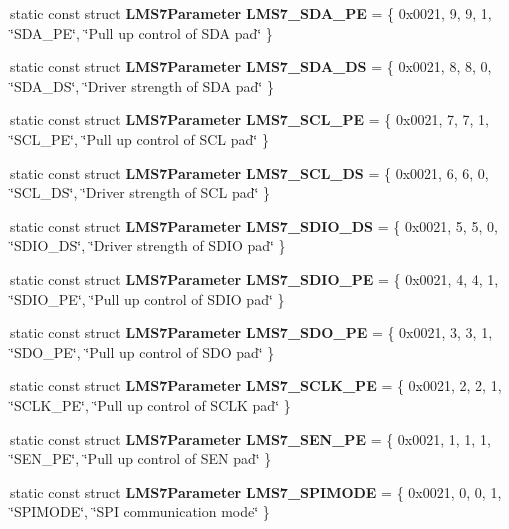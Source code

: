 \begin{DoxyCompactItemize}
\item 
static const struct {\bf L\+M\+S7\+Parameter} {\bf L\+M\+S7\+\_\+\+S\+D\+A\+\_\+\+PE} = \{ 0x0021, 9, 9, 1, \char`\"{}\+S\+D\+A\+\_\+\+P\+E\char`\"{}, \char`\"{}\+Pull up control of S\+D\+A pad\char`\"{} \}
\item 
static const struct {\bf L\+M\+S7\+Parameter} {\bf L\+M\+S7\+\_\+\+S\+D\+A\+\_\+\+DS} = \{ 0x0021, 8, 8, 0, \char`\"{}\+S\+D\+A\+\_\+\+D\+S\char`\"{}, \char`\"{}\+Driver strength of S\+D\+A pad\char`\"{} \}
\item 
static const struct {\bf L\+M\+S7\+Parameter} {\bf L\+M\+S7\+\_\+\+S\+C\+L\+\_\+\+PE} = \{ 0x0021, 7, 7, 1, \char`\"{}\+S\+C\+L\+\_\+\+P\+E\char`\"{}, \char`\"{}\+Pull up control of S\+C\+L pad\char`\"{} \}
\item 
static const struct {\bf L\+M\+S7\+Parameter} {\bf L\+M\+S7\+\_\+\+S\+C\+L\+\_\+\+DS} = \{ 0x0021, 6, 6, 0, \char`\"{}\+S\+C\+L\+\_\+\+D\+S\char`\"{}, \char`\"{}\+Driver strength of S\+C\+L pad\char`\"{} \}
\item 
static const struct {\bf L\+M\+S7\+Parameter} {\bf L\+M\+S7\+\_\+\+S\+D\+I\+O\+\_\+\+DS} = \{ 0x0021, 5, 5, 0, \char`\"{}\+S\+D\+I\+O\+\_\+\+D\+S\char`\"{}, \char`\"{}\+Driver strength of S\+D\+I\+O pad\char`\"{} \}
\item 
static const struct {\bf L\+M\+S7\+Parameter} {\bf L\+M\+S7\+\_\+\+S\+D\+I\+O\+\_\+\+PE} = \{ 0x0021, 4, 4, 1, \char`\"{}\+S\+D\+I\+O\+\_\+\+P\+E\char`\"{}, \char`\"{}\+Pull up control of S\+D\+I\+O pad\char`\"{} \}
\item 
static const struct {\bf L\+M\+S7\+Parameter} {\bf L\+M\+S7\+\_\+\+S\+D\+O\+\_\+\+PE} = \{ 0x0021, 3, 3, 1, \char`\"{}\+S\+D\+O\+\_\+\+P\+E\char`\"{}, \char`\"{}\+Pull up control of S\+D\+O pad\char`\"{} \}
\item 
static const struct {\bf L\+M\+S7\+Parameter} {\bf L\+M\+S7\+\_\+\+S\+C\+L\+K\+\_\+\+PE} = \{ 0x0021, 2, 2, 1, \char`\"{}\+S\+C\+L\+K\+\_\+\+P\+E\char`\"{}, \char`\"{}\+Pull up control of S\+C\+L\+K pad\char`\"{} \}
\item 
static const struct {\bf L\+M\+S7\+Parameter} {\bf L\+M\+S7\+\_\+\+S\+E\+N\+\_\+\+PE} = \{ 0x0021, 1, 1, 1, \char`\"{}\+S\+E\+N\+\_\+\+P\+E\char`\"{}, \char`\"{}\+Pull up control of S\+E\+N pad\char`\"{} \}
\item 
static const struct {\bf L\+M\+S7\+Parameter} {\bf L\+M\+S7\+\_\+\+S\+P\+I\+M\+O\+DE} = \{ 0x0021, 0, 0, 1, \char`\"{}\+S\+P\+I\+M\+O\+D\+E\char`\"{}, \char`\"{}\+S\+P\+I communication mode\char`\"{} \}
\item 

\end{DoxyCompactItemize}
